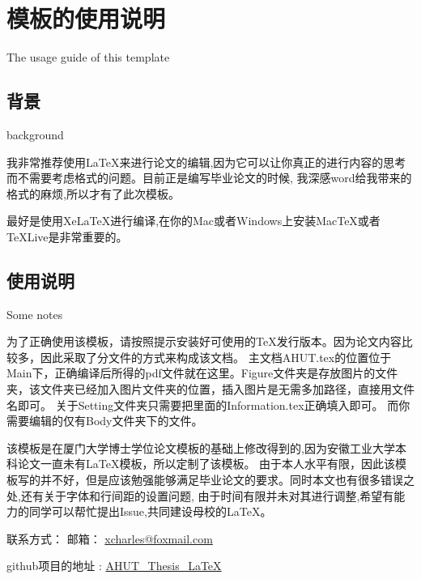 
\chapter{模板的使用说明}{The usage guide of this template}

\section{背景}{background}

我非常推荐使用LaTeX来进行论文的编辑,因为它可以让你真正的进行内容的思考而不需要考虑格式的问题。目前正是编写毕业论文的时候,
我深感word给我带来的格式的麻烦,所以才有了此次模板。

最好是使用XeLaTeX进行编译,在你的Mac或者Windows上安装MacTeX或者TeXLive是非常重要的。


\section{使用说明}{Some notes}

为了正确使用该模板，请按照提示安装好可使用的TeX发行版本。因为论文内容比较多，因此采取了分文件的方式来构成该文档。
主文档AHUT.tex的位置位于Main下，正确编译后所得的pdf文件就在这里。Figure文件夹是存放图片的文件夹，该文件夹已经加入图片文件夹的位置，插入图片是无需多加路径，直接用文件名即可。
关于Setting文件夹只需要把里面的Information.tex正确填入即可。
而你需要编辑的仅有Body文件夹下的文件。

该模板是在厦门大学博士学位论文模板的基础上修改得到的,因为安徽工业大学本科论文一直未有LaTeX模板，所以定制了该模板。
由于本人水平有限，因此该模板写的并不好，但是应该勉强能够满足毕业论文的要求。同时本文也有很多错误之处,还有关于字体和行间距的设置问题,
由于时间有限并未对其进行调整,希望有能力的同学可以帮忙提出Issue,共同建设母校的LaTeX。


联系方式：
邮箱： \href{mailto:xcharles@foxmail.com}{xcharles@foxmail.com}

github项目的地址 : \href{https://github.com/XXJG/AHUT_Thesis_LaTeX}{AHUT_Thesis_LaTeX}
